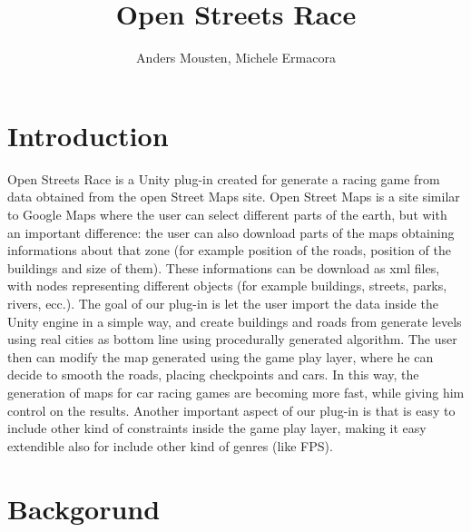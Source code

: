 \documentclass[conference]{IEEEtran}
\begin{document}
\title{\ \\ \LARGE\bf Open Streets Race}

\author{Anders Mousten, Michele Ermacora}


\maketitle

%

\section{Introduction}

Open Streets Race is a Unity \cite{unity} plug-in created for generate a racing game from data obtained from the open Street Maps \cite{openstreet} site. Open Street Maps is a site similar to Google Maps  \cite{gmaps} where the user can select different parts of the earth, but with an important difference: the user can also download parts of the maps obtaining informations about that zone (for example position of the roads, position of the buildings and size of them). These informations can be download as xml files, with nodes representing different objects (for example buildings, streets, parks, rivers, ecc.). The goal of our plug-in is let the user import the data inside the Unity \cite{unity} engine in a simple way, and create buildings and roads from generate levels using real cities as bottom line using procedurally generated algorithm. The user then can modify the map generated using the game play layer, where he can decide to smooth the roads, placing checkpoints and cars. In this way, the generation of maps for car racing games are becoming more fast, while giving him control on the results.  Another important aspect of our plug-in is that is easy to include other kind of constraints inside the game play layer, making it easy extendible also for include other kind of genres (like FPS).

\section{Backgorund}
\end{document}
